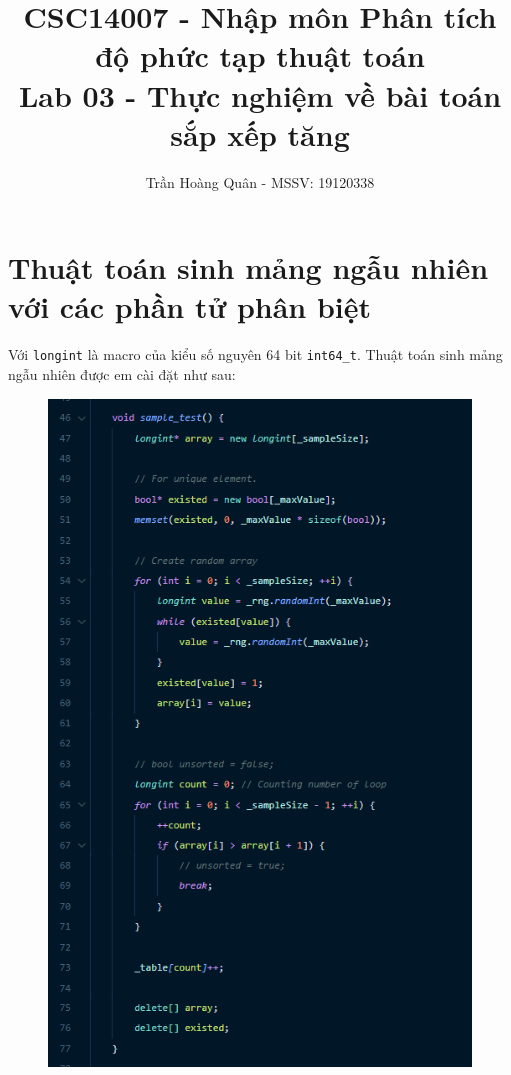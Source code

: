 \documentclass[12pt]{article}
\title{
	CSC14007 - Nhập môn Phân tích độ phức tạp thuật toán\\
	Lab 03 - Thực nghiệm về bài toán sắp xếp tăng
}
\author{Trần Hoàng Quân - MSSV: 19120338}
\begin{document}
\maketitle
\tableofcontents
\pagebreak

\section{Thuật toán sinh mảng ngẫu nhiên với các phần tử phân biệt}
Với \texttt{longint} là macro của kiểu số nguyên 64 bit \texttt{int64\_t}. Thuật toán sinh mảng ngẫu nhiên được em cài đặt như sau:
\begin{figure}[H]
\centering
\includegraphics{testing-code.PNG}
\end{figure}
\end{document}
